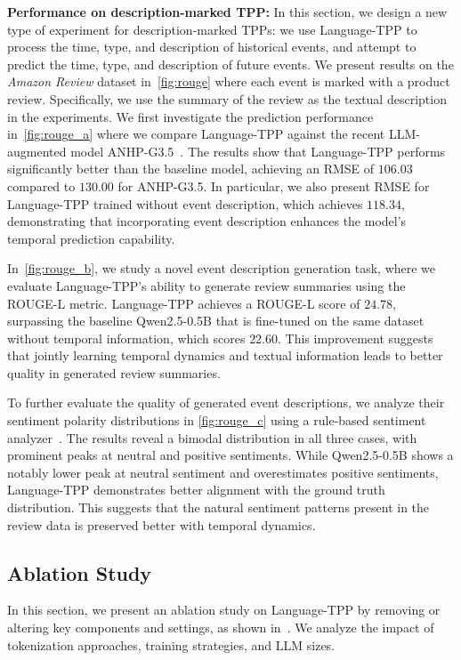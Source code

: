 \textbf{Performance on description-marked TPP:}
In this section, we design a new type of experiment for description-marked TPPs: we use Language-TPP to process the time, type, and description of historical events, and attempt to predict the time, type, and description of future events. 
We present results on the \textit{Amazon Review} dataset in~\cref{fig:rouge} where each event is marked with a product review. Specifically, we use the summary of the review as the textual description in the experiments. 
We first investigate the prediction performance in~\cref{fig:rouge_a} where we compare Language-TPP against the recent LLM-augmented model ANHP-G3.5~\citep{shi2024language}. The results show that Language-TPP performs significantly better than the baseline model, achieving an RMSE of $106.03$ compared to $130.00$ for ANHP-G3.5. 
In particular, we also present RMSE for Language-TPP trained without event description, which achieves $118.34$, demonstrating that incorporating event description enhances the model's temporal prediction capability. 

In~\cref{fig:rouge_b}, we study a novel event description generation task, where we evaluate Language-TPP's ability to generate review summaries using the ROUGE-L metric. 
Language-TPP achieves a ROUGE-L score of $24.78$, surpassing the baseline Qwen2.5-0.5B that is fine-tuned on the same dataset without temporal information, which scores $22.60$. 
This improvement suggests that jointly learning temporal dynamics and textual information leads to better quality in generated review summaries.

To further evaluate the quality of generated event descriptions, we analyze their sentiment polarity distributions in \cref{fig:rouge_c} using a rule-based sentiment analyzer~\citep{hutto2014vader}. The results reveal a bimodal distribution in all three cases, with prominent peaks at neutral and positive sentiments. While Qwen2.5-0.5B shows a notably lower peak at neutral sentiment and overestimates positive sentiments, Language-TPP demonstrates better alignment with the ground truth distribution. This suggests that the natural sentiment patterns present in the review data is preserved better with temporal dynamics.











\subsection{Ablation Study}
\label{ssec:ablation}
In this section, we present an ablation study on Language-TPP by removing or altering key components and settings, as shown in~. 
We analyze the impact of tokenization approaches, training strategies, and LLM sizes. 

